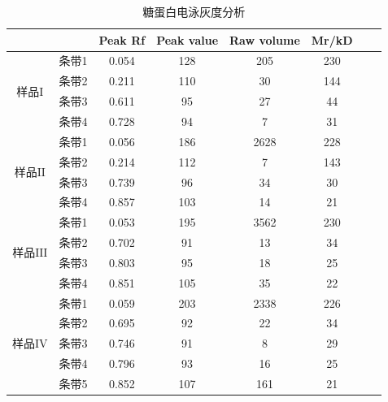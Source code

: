 \begin{table}[H]
\centering
\caption{糖蛋白电泳灰度分析}
\label{tab:my-table}
\begin{tabular}{@{}ccccccll@{}}
\toprule
                     &     & Peak Rf & Peak value & Raw volume & Mr/kD &  &  \\ \midrule
\multirow{4}{*}{样品$\mathrm{I}$} & 条带1 & 0.054   & 128        & 205        & 230   &  &  \\
                     & 条带2 & 0.211   & 110        & 30         & 144   &  &  \\
                     & 条带3 & 0.611   & 95         & 27         & 44    &  &  \\
                     & 条带4 & 0.728   & 94         & 7          & 31    &  &  \\  \midrule
\multirow{4}{*}{样品$\mathrm{II}$} & 条带1 & 0.056   & 186        & 2628       & 228   &  &  \\
                     & 条带2 & 0.214   & 112        & 7          & 143   &  &  \\
                     & 条带3 & 0.739   & 96         & 34         & 30    &  &  \\
                     & 条带4 & 0.857   & 103        & 14         & 21    &  &  \\ \midrule
\multirow{4}{*}{样品$\mathrm{III}$} & 条带1 & 0.053   & 195        & 3562       & 230   &  &  \\
                     & 条带2 & 0.702   & 91         & 13         & 34    &  &  \\
                     & 条带3 & 0.803   & 95         & 18         & 25    &  &  \\
                     & 条带4 & 0.851   & 105        & 35         & 22    &  &  \\  \midrule
\multirow{5}{*}{样品$\mathrm{IV}$} & 条带1 & 0.059   & 203        & 2338       & 226   &  &  \\
                     & 条带2 & 0.695   & 92         & 22         & 34    &  &  \\
                     & 条带3 & 0.746   & 91         & 8          & 29    &  &  \\
                     & 条带4 & 0.796   & 93         & 16         & 25    &  &  \\
                     & 条带5 & 0.852   & 107        & 161        & 21    &  &  \\ 
\bottomrule
\end{tabular}
\end{table}

